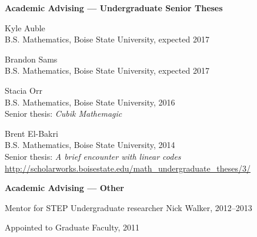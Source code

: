 \documentclass[12pt]{article}
\begin{document}
\textbf{Academic Advising --- Undergraduate Senior Theses}
\begin{description}
\setlength{}
\item[] Kyle Auble \\
B.S. Mathematics, Boise State University, expected 2017

\item[] Brandon Sams \\
B.S. Mathematics, Boise State University, expected 2017

\item[] Stacia Orr \\
B.S. Mathematics, Boise State University, 2016 \\
Senior thesis: \emph{Cubik Mathemagic}

\item[] Brent El-Bakri \\
B.S. Mathematics, Boise State University, 2014 \\
Senior thesis: \emph{A brief encounter with linear codes} \\
\url{http://scholarworks.boisestate.edu/math_undergraduate_theses/3/}
\end{description}



\textbf{Academic Advising --- Other}
\begin{description}
\setlength{}
\item[] Mentor for STEP Undergraduate researcher Nick Walker, 2012--2013

\item[] Appointed to Graduate Faculty, 2011
\end{description}
\end{document}
